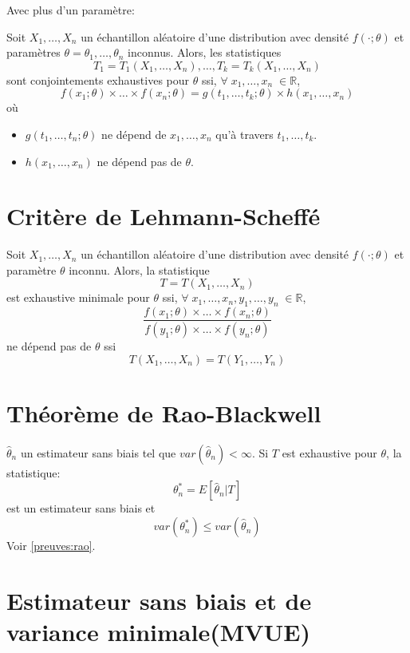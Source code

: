 \documentclass[]{book}
\providecommand{\tightlist}{%
  \setlength{\itemsep}{0pt}\setlength{\parskip}{0pt}}
\theoremstyle{definition}
\theoremstyle{definition}
\theoremstyle{definition}
\theoremstyle{remark}
\begin{document}
Avec plus d'un paramètre:

Soit \(X_1,\dots,X_n\) un échantillon aléatoire d'une distribution avec
densité \(f(\cdot;\theta)\) et paramètres
\(\theta=\theta_1,\dots,\theta_n\) inconnus. Alors, les statistiques \[
T_1=T_1(X_1,\dots,X_n),\dots,T_k=T_k(X_1,\dots,X_n)
\] sont conjointements exhaustives pour \(\theta\) ssi,
\(\forall\;x_1,\dots,x_n\;\in\mathbb{R}\), \[
f(x_1;\theta)\times\dots\times f(x_n;\theta)=g(t_1,\dots,t_k;\theta)\times h(x_1,\dots,x_n)
\] où

\begin{itemize}
\tightlist
\item
  \(g(t_1,\dots,t_n;\theta)\) ne dépend de \(x_1,\dots,x_n\) qu'à
  travers \(t_1,\dots,t_k\).
\item
  \(h(x_1,\dots,x_n)\) ne dépend pas de \(\theta\).
\end{itemize}

\section{Critère de Lehmann-Scheffé}\label{critere-de-lehmann-scheffe}

Soit \(X_1,\dots,X_n\) un échantillon aléatoire d'une distribution avec
densité \(f(\cdot;\theta)\) et paramètre \(\theta\) inconnu. Alors, la
statistique \[
T=T(X_1,\dots,X_n)
\] est exhaustive minimale pour \(\theta\) ssi,
\(\forall\;x_1,\dots,x_n,y_1,\dots,y_n\;\in\mathbb{R}\), \[
\frac{f(x_1;\theta)\times\dots\times f(x_n;\theta)}{f(y_1;\theta)\times\dots\times f(y_n;\theta)}
\] ne dépend pas de \(\theta\) ssi \[
T(X_1,\dots,X_n)=T(Y_1,\dots,Y_n)
\]

\section{Théorème de Rao-Blackwell}\label{theoreme-de-rao-blackwell}

\label{stats:rao} \(\hat{\theta}_n\) un estimateur sans biais tel que
\(var(\hat{\theta}_n)<\infty\). Si \(T\) est exhaustive pour \(\theta\),
la statistique: \[
\theta^{*}_n=E[\hat{\theta}_n|T]
\] est un estimateur sans biais et \[
var(\theta^{*}_n)\le var(\hat{\theta}_n)
\] Voir \autoref{preuves:rao}.

\section{Estimateur sans biais et de variance
minimale(MVUE)}\label{estimateur-sans-biais-et-de-variance-minimalemvue}
\end{document}
